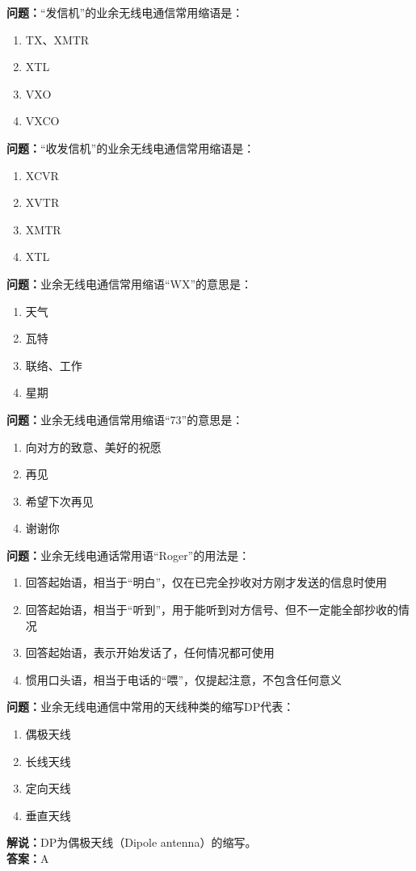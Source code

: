 \documentclass{ctexbook}%
\begin{document}
\textbf{问题：}“发信机”的业余无线电通信常用缩语是：
\begin{enumerate}[label=\Alph*), leftmargin=3em]
\item TX、XMTR
\item XTL
\item VXO
\item VXCO
\end{enumerate}

\textbf{问题：}“收发信机”的业余无线电通信常用缩语是：
\begin{enumerate}[label=\Alph*), leftmargin=3em]
\item XCVR
\item XVTR
\item XMTR
\item XTL
\end{enumerate}

\textbf{问题：}业余无线电通信常用缩语“WX”的意思是：
\begin{enumerate}[label=\Alph*), leftmargin=3em]
\item 天气
\item 瓦特
\item 联络、工作
\item 星期
\end{enumerate}

\textbf{问题：}业余无线电通信常用缩语“73”的意思是：
\begin{enumerate}[label=\Alph*), leftmargin=3em]
\item 向对方的致意、美好的祝愿
\item 再见
\item 希望下次再见
\item 谢谢你
\end{enumerate}

\textbf{问题：}业余无线电通话常用语“Roger”的用法是：
\begin{enumerate}[label=\Alph*), leftmargin=3em]
\item 回答起始语，相当于“明白”，仅在已完全抄收对方刚才发送的信息时使用
\item 回答起始语，相当于“听到”，用于能听到对方信号、但不一定能全部抄收的情况
\item 回答起始语，表示开始发话了，任何情况都可使用
\item 惯用口头语，相当于电话的“喂”，仅提起注意，不包含任何意义
\end{enumerate}

\textbf{问题：}业余无线电通信中常用的天线种类的缩写DP代表：
\begin{enumerate}[label=\Alph*), leftmargin=3em]
\item 偶极天线
\item 长线天线
\item 定向天线
\item 垂直天线
\end{enumerate}
\textbf{解说：}DP为偶极天线（Dipole antenna）的缩写。\\
\textbf{答案：}A
\end{document}
